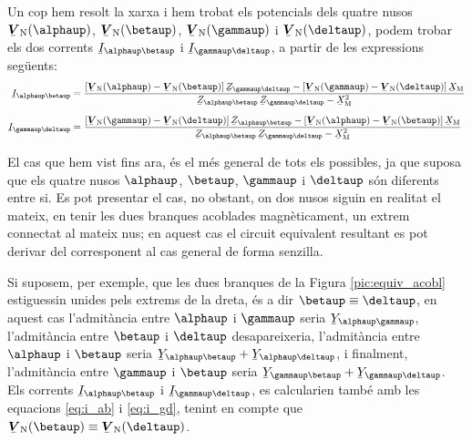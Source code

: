 Un cop hem resolt la xarxa i hem trobat els potencials dels quatre
nusos $\mcmplx{V}\ped{N}(\alphaup)$, $\mcmplx{V}\ped{N}(\betaup)$,
$\mcmplx{V}\ped{N}(\gammaup)$ i $\mcmplx{V}\ped{N}(\deltaup)$, podem
trobar els dos corrents $\cmplx{I}_{\alphaup\betaup}$ i
$\cmplx{I}_{\gammaup\deltaup}$, a partir de les expressions seg\"{u}ents:
\begin{subequations}
\begin{align}
    \cmplx{I}_{\alphaup\betaup} &=  \frac{[\mcmplx{V}\ped{N}(\alphaup) - \mcmplx{V}\ped{N}(\betaup)] \, \cmplx{Z}_{\gammaup\deltaup} - [\mcmplx{V}\ped{N}(\gammaup) - \mcmplx{V}\ped{N}(\deltaup)] \,
    \cmplx{X}\ped{M}}{\cmplx{Z}_{\alphaup\betaup}\,
    \cmplx{Z}_{\gammaup\deltaup}-\cmplx{X}\ped{M}^2} \label{eq:i_ab}
    \\[1.5ex]
    \cmplx{I}_{\gammaup\deltaup} &= \frac{[\mcmplx{V}\ped{N}(\gammaup) - \mcmplx{V}\ped{N}(\deltaup)] \, \cmplx{Z}_{\alphaup\betaup} - [\mcmplx{V}\ped{N}(\alphaup) - \mcmplx{V}\ped{N}(\betaup)] \,
    \cmplx{X}\ped{M}}{\cmplx{Z}_{\alphaup\betaup}\,
    \cmplx{Z}_{\gammaup\deltaup}-\cmplx{X}\ped{M}^2} \label{eq:i_gd}
\end{align}
\end{subequations}

El cas que hem vist fins ara, \'{e}s el m\'{e}s general de tots els
possibles, ja que suposa que els quatre nusos $\alphaup$, $\betaup$,
$\gammaup$ i $\deltaup$ s\'{o}n diferents entre si. Es pot presentar el cas,
no obstant, on dos nusos siguin en realitat el mateix, en tenir les
dues branques acoblades magn\`{e}ticament, un extrem connectat al mateix
nus; en aquest cas el circuit equivalent resultant es pot derivar
del corresponent al cas general de forma senzilla.

Si suposem, per exemple, que les dues branques de la Figura
\vref{pic:equiv_acobl} estiguessin unides pels extrems de la dreta,
\'{e}s a dir $\betaup\equiv\deltaup$, en aquest cas l'admit\`{a}ncia entre
$\alphaup$ i $\gammaup$ seria $\cmplx{Y}_{\alphaup\gammaup}$, l'admit\`{a}ncia
entre $\betaup$ i $\deltaup$ desapareixeria, l'admit\`{a}ncia entre $\alphaup$
i $\betaup$ seria $\cmplx{Y}_{\alphaup\betaup} +
\cmplx{Y}_{\alphaup\deltaup}$, i finalment, l'admit\`{a}ncia entre $\gammaup$
i $\betaup$ seria $\cmplx{Y}_{\gammaup\betaup} +
\cmplx{Y}_{\gammaup\deltaup}$. Els corrents $\cmplx{I}_{\alphaup\betaup}$ i
$\cmplx{I}_{\gammaup\deltaup}$, es calcularien tamb\'{e} amb les equacions
\eqref{eq:i_ab} i \eqref{eq:i_gd}, tenint en compte que
$\mcmplx{V}\ped{N}(\betaup)\equiv\mcmplx{V}\ped{N}(\deltaup)$.

